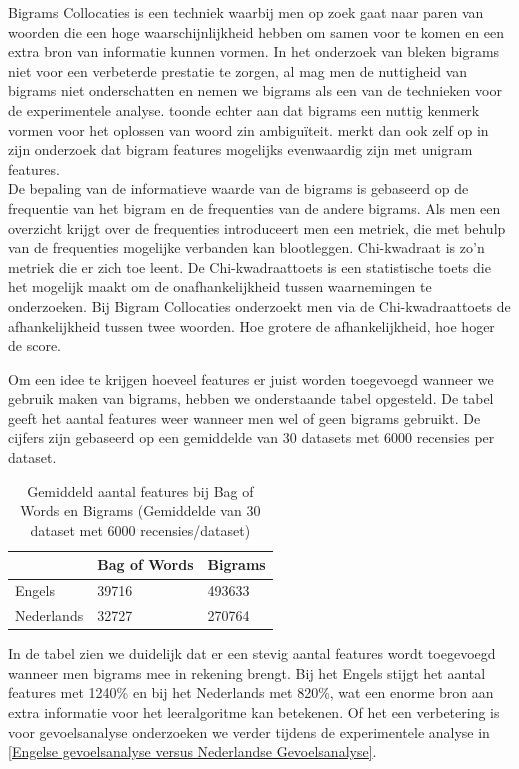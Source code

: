 Bigrams Collocaties is een techniek waarbij men op zoek gaat naar paren van woorden die een hoge waarschijnlijkheid hebben om samen voor te komen en een extra bron van informatie kunnen vormen. In het onderzoek van \cite{pang2002thumbs} bleken bigrams niet voor een verbeterde prestatie te zorgen, al mag men de nuttigheid van bigrams niet onderschatten en nemen we bigrams als een van de technieken voor de experimentele analyse.\cite{pedersen2001decision} toonde echter aan dat bigrams een nuttig kenmerk vormen voor het oplossen van woord zin ambigu\"iteit. \cite{pang2002thumbs} merkt dan ook zelf op in zijn onderzoek dat bigram features mogelijks evenwaardig zijn met unigram features.\\
%
De bepaling van de informatieve waarde van de bigrams is gebaseerd op de frequentie van het bigram en de frequenties van de andere bigrams. Als men een overzicht krijgt over de frequenties introduceert men een metriek, die met behulp van de frequenties mogelijke verbanden kan blootleggen. Chi-kwadraat is zo'n metriek die er zich toe leent. De Chi-kwadraattoets is een statistische toets die het mogelijk maakt om de onafhankelijkheid tussen waarnemingen te onderzoeken. Bij Bigram Collocaties onderzoekt men via de Chi-kwadraattoets de afhankelijkheid tussen twee woorden. Hoe grotere de afhankelijkheid, hoe hoger de score. 

Om een idee te krijgen hoeveel features er juist worden toegevoegd wanneer we gebruik maken van bigrams, hebben we onderstaande tabel opgesteld. De tabel geeft het aantal features weer wanneer men wel of geen bigrams gebruikt. De cijfers zijn gebaseerd op een gemiddelde van 30 datasets met 6000 recensies per dataset.

\begin{table}[h]
\centering
\begin{tabular}{l|l|l|}
\cline{2-3}
                                 & Bag of Words & Bigrams \\ \hline
\multicolumn{1}{|l|}{Engels}     & 39716        & 493633  \\ \hline
\multicolumn{1}{|l|}{Nederlands} & 32727        & 270764  \\ \hline
\end{tabular}
\caption{Gemiddeld aantal features bij Bag of Words en Bigrams (Gemiddelde van 30 dataset met 6000 recensies/dataset)}
\end{table}

In de tabel zien we duidelijk dat er een stevig aantal features wordt toegevoegd wanneer men bigrams mee in rekening brengt. Bij het Engels stijgt het aantal features met 1240\% en bij het Nederlands met 820\%, wat een enorme bron aan extra informatie voor het leeralgoritme kan betekenen. Of het een verbetering is voor gevoelsanalyse onderzoeken we verder tijdens de experimentele analyse in \ref{Engelse gevoelsanalyse versus Nederlandse Gevoelsanalyse}.

